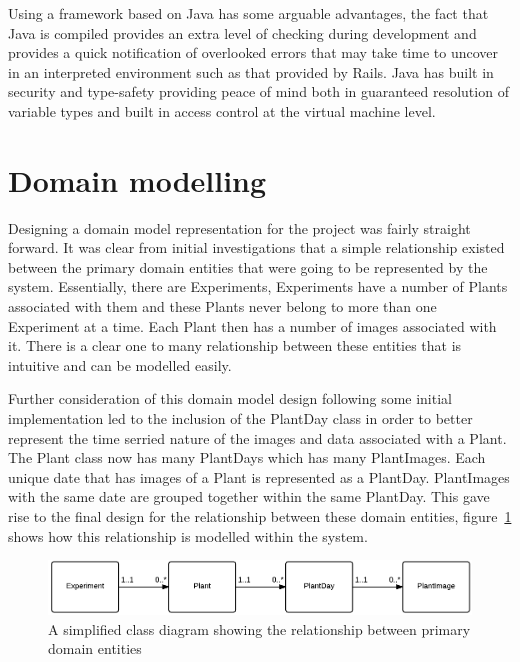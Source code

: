 Using a framework based on Java has some arguable advantages, the fact that Java is compiled provides an extra level of checking during development and provides a quick notification of overlooked errors that may take time to uncover in an interpreted environment such as that provided by Rails. Java has built in security and type-safety providing peace of mind both in guaranteed resolution of variable types and built in access control at the virtual machine level. 





\section{Domain modelling}

Designing a domain model representation for the project was fairly straight forward. It was clear from initial investigations that a simple relationship existed between the primary domain entities that were going to be represented by the system. Essentially, there are Experiments, Experiments have a number of Plants associated with them and these Plants never belong to more than one Experiment at a time. Each Plant then has a number of images associated with it. There is a clear one to many relationship between these entities that is intuitive and can be modelled easily.

Further consideration of this domain model design following some initial implementation led to the inclusion of the PlantDay class in order to better represent the time serried nature of the images and data associated with a Plant. The Plant class now has many PlantDays which has many PlantImages. Each unique date that has images of a Plant is represented as a PlantDay. PlantImages with the same date are grouped together within the same PlantDay. This gave rise to the final design for the relationship between these domain entities, figure~\ref{fig:domain1} shows how this relationship is modelled within the system. 


\begin{figure}[H]
    \centering
    \includegraphics[width=\textwidth]{images/design/domain1}
    \caption{A simplified class diagram showing the relationship between primary domain entities}
    \label{fig:domain1}
\end{figure}


